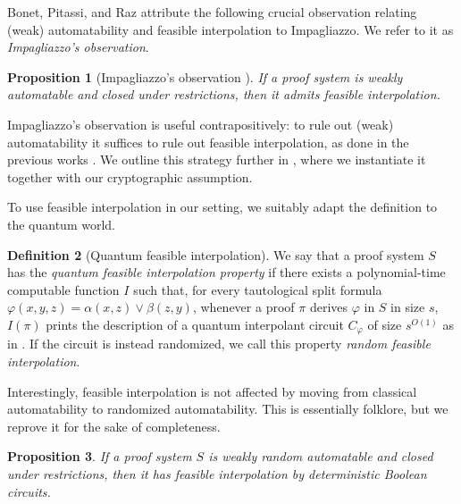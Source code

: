 \documentclass[11pt]{article}
\theoremstyle{definition}
\newtheorem{definition}{Definition}[section]
\theoremstyle{plain}
\newtheorem{proposition}[definition]{Proposition}
\theoremstyle{remark}
\let\autocite\cite\let\textcite\citet
\begin{document}
Bonet, Pitassi, and Raz attribute the following crucial observation relating (weak) automatability and feasible interpolation to Impagliazzo. We refer to it as \emph{Impagliazzo's observation}.

\begin{proposition}[Impagliazzo's observation {\autocite[Thm. 1.1]{BPR1997}}]
    If a proof system is weakly automatable and closed under restrictions, then it admits feasible interpolation.
\end{proposition}

Impagliazzo's observation is useful contrapositively: to rule out (weak) automatability it suffices to rule out feasible interpolation, as done in the previous works \cite{KP98, BPR1997}. We outline this strategy further in , where we instantiate it together with our cryptographic assumption.

To use feasible interpolation in our setting, we suitably adapt the definition to the quantum world.

\begin{definition}[Quantum feasible interpolation]
\label{def:qfi}
We say that a proof system $S$ has the \emph{quantum feasible interpolation property} if there exists a polynomial-time computable function $I$ such that, for every tautological split formula $\varphi(x, y, z) = \alpha(x, z) \lor \beta(z, y)$, whenever a proof $\pi$ derives $\varphi$ in $S$ in size $s$, $I(\pi)$ prints the description of a quantum interpolant circuit $C_\varphi$ of size $s^{O(1)}$ as in . If the circuit is instead randomized, we call this property \emph{random feasible interpolation}.
\end{definition}

Interestingly, feasible interpolation is not affected by moving from classical automatability to randomized automatability. This is essentially folklore, but we reprove it for the sake of completeness.

\begin{proposition}
\label{prop:rand-impa}
If a proof system $S$ is weakly random automatable and closed under restrictions, then it has feasible interpolation by deterministic Boolean circuits.
\end{proposition}
\end{document}
